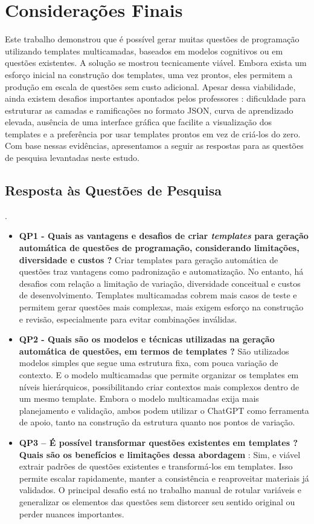 \chapter{Considerações Finais}

Este trabalho demonstrou que é possível gerar muitas questões de programação utilizando templates multicamadas, baseados em modelos cognitivos ou em questões existentes. A solução se mostrou tecnicamente viável. Embora exista um esforço inicial na construção dos templates, uma vez prontos, eles permitem a produção em escala de questões sem custo adicional. Apesar dessa viabilidade, ainda existem desafios importantes apontados pelos professores : dificuldade para estruturar as camadas e ramificações no formato JSON, curva de aprendizado elevada, ausência de uma interface gráfica que facilite a visualização dos templates e a preferência por usar templates prontos em vez de criá-los do zero. Com base nessas evidências, apresentamos a seguir as respostas para as questões de pesquisa levantadas neste estudo.

\section{Resposta às Questões de Pesquisa }
.
\begin{itemize}
    \item \textbf{QP1 - Quais as vantagens e desafios de criar\textit{ templates} para geração automática de questões de programação, considerando limitações, diversidade e custos ?}  Criar templates para geração automática de questões traz vantagens como padronização e automatização. No entanto, há desafios com relação a limitação de variação, diversidade conceitual e custos de desenvolvimento. Templates multicamadas cobrem mais casos de teste e permitem gerar questões mais complexas, mais exigem esforço na construção e revisão, especialmente para evitar combinações inválidas.
    \item\textbf{QP2 - Quais são os modelos e técnicas utilizadas na geração automática de questões, em termos de templates ?} São utilizados modelos simples que segue uma estrutura fixa, com pouca variação de contexto. E o modelo multicamadas que permite organizar os templates em níveis hierárquicos, possibilitando criar contextos mais complexos  dentro de um mesmo template. Embora o modelo multicamadas exija mais planejamento e validação, ambos podem utilizar o ChatGPT como ferramenta de apoio, tanto na construção da estrutura quanto nos pontos de variação.
    \item\textbf{QP3 – É possível transformar questões existentes em templates ? Quais são os benefícios e limitações dessa abordagem }: Sim, e viável extrair padrões de questões existentes e transformá-los em templates. Isso permite escalar rapidamente, manter a consistência e reaproveitar materiais já validados. O principal desafio está no trabalho manual de rotular variáveis e generalizar os elementos das questões sem distorcer seu sentido original ou perder nuances importantes.    
\end{itemize}


